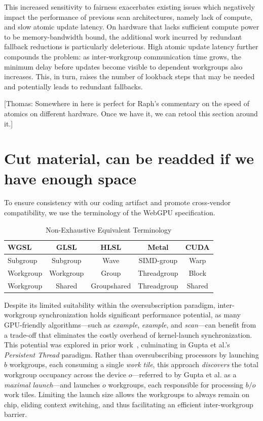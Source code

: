 \documentclass[sigconf]{acmart}
\newcommand{\thomas}[1]{{\footnotesize\color{orange}[Thomas: #1]}}
\begin{document}
This increased sensitivity to fairness exacerbates existing issues which negatively impact the performance of previous scan architectures, namely lack of compute, and slow atomic update latency. On hardware that lacks sufficient compute power to be memory-bandwidth bound, the additional work incurred by redundant fallback reductions is particularly deleterious. High atomic update latency further compounds the problem: as inter-workgroup communication time grows, the minimum delay before updates become visible to dependent workgroups also increases. This, in turn, raises the number of lookback steps that may be needed and potentially leads to redundant fallbacks.

\thomas{Somewhere in here is perfect for Raph's commentary on the speed of atomics on different hardware. Once we have it, we can retool this section around it.}



\section{Cut material, can be readded if we have enough space}

To ensure consistency with our coding artifact and promote cross-vendor compatibility, we use the terminology of the WebGPU specification.
\setlength{\tabcolsep}{3pt}
\begin{table}[h]
  \centering
  \caption{Non-Exhaustive Equivalent Terminology}
  \label{tab:terminology}
  \begin{tabular}{lcccc}
    \toprule
    \textbf{WGSL}   & \textbf{GLSL}  & \textbf{HLSL}   & \textbf{Metal}     & \textbf{CUDA} \\ \midrule
    Subgroup        & Subgroup       & Wave            & SIMD-group         & Warp          \\
    Workgroup       & Workgroup      & Group           & Threadgroup        & Block         \\
    Workgroup       & Shared         & Groupshared     & Threadgroup        & Shared        \\ \bottomrule
  \end{tabular}
\end{table}

Despite its limited suitability within the oversubscription paradigm, inter-workgroup synchronization holds significant performance potential, as many GPU-friendly algorithms—such as \emph{example}, \emph{example}, and \emph{scan}---can benefit from a trade-off that eliminates the costly overhead of kernel-launch synchronization. This potential was explored in prior work~\cite{}, culminating in Gupta et al.’s~\cite{} \emph{Persistent Thread} paradigm. Rather than oversubscribing processors by launching $b$ workgroups, each consuming a single \emph{work tile}, this approach \emph{discovers} the total workgroup occupancy across the device $o$---referred to by Gupta et al. as a \emph{maximal launch}---and launches $o$ workgroups, each responsible for processing $b/o$ work tiles. Limiting the launch size allows the workgroups to always remain on chip, eliding context switching, and thus facilitating an efficient inter-workgroup barrier.
\end{document}

